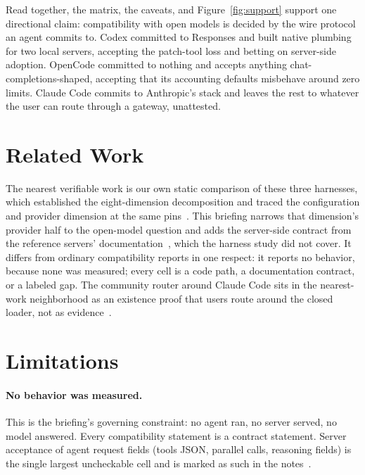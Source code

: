 \documentclass{article}
\newcommand{\codex}[0]{Codex}
\newcommand{\occ}[0]{OpenCode}
\newcommand{\ccc}[0]{Claude Code}
\begin{document}
Read together, the matrix, the caveats, and Figure~\ref{fig:support}
support one directional claim:
compatibility with open models is decided by the wire protocol an agent
commits to. \codex{} committed to Responses and built native plumbing
for two local servers, accepting the patch-tool loss and betting on
server-side adoption. \occ{} committed to nothing and accepts anything
chat-completions-shaped, accepting that its accounting defaults misbehave
around zero limits. \ccc{} commits to Anthropic's stack and leaves the
rest to whatever the user can route through a gateway, unattested.

\section{Related Work}
\label{sec:related}

The nearest verifiable work is our own static comparison of these three
harnesses, which established the eight-dimension decomposition and
traced the configuration and provider dimension at the same
pins~\citep{codexRepo,opencodeRepo,claudeCodeSurface}. This briefing
narrows that dimension's provider half to the open-model question and
adds the server-side contract from the reference servers'
documentation~\citep{ollamaCompatDocs,lmstudioApiDocs,%
llamaCppServerDocs}, which the harness study did not cover. It differs
from ordinary compatibility reports in one respect: it reports no
behavior, because none was measured; every cell is a code path, a
documentation contract, or a labeled gap. The community router around
\ccc{} sits in the nearest-work neighborhood as an existence proof that
users route around the closed loader, not as
evidence~\citep{claudeCodeRouterContext}.

\section{Limitations}
\label{sec:limitations}

\paragraph{No behavior was measured.} This is the briefing's governing
constraint: no agent ran, no server served, no model answered. Every
compatibility statement is a contract statement. Server acceptance of
agent request fields (tools JSON, parallel calls, reasoning fields) is
the single largest uncheckable cell and is marked as such in the
notes~\citep{codexRepo,lmstudioApiDocs}.
\end{document}
